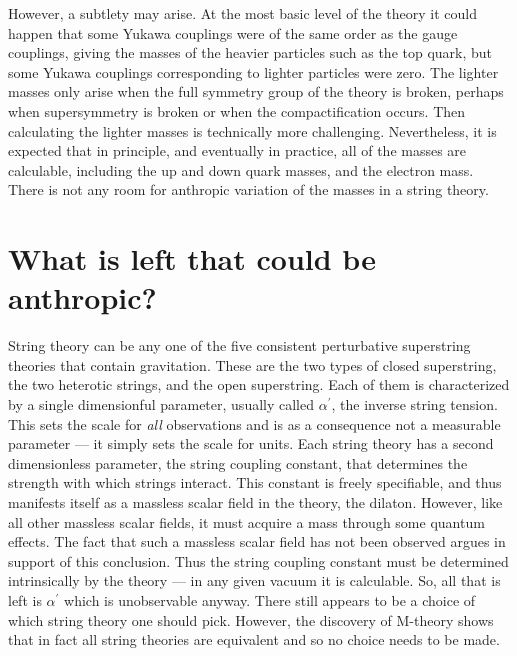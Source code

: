 \documentclass{article}
\begin{document}
However, a subtlety may arise.  At the most basic level of the
theory it could happen that some Yukawa couplings were of the same order
as the gauge couplings, giving the masses of the heavier particles such as
the top quark, but some Yukawa couplings corresponding to lighter
particles were zero.  The lighter masses only arise when the full
symmetry group of the theory is broken, perhaps when supersymmetry is
broken or when the compactification occurs.  Then calculating the lighter
masses is technically more challenging.  Nevertheless, it is expected that
in
principle, and eventually in practice, all of the masses are calculable,
including the up and down quark masses, and the electron mass.  There is
not any room for anthropic variation of the masses in a string theory.


\section{What is left that could be anthropic?}

String theory can be any one of the five consistent perturbative
superstring theories that contain gravitation. These are the two types
of closed superstring, the two heterotic strings, and the open
superstring. Each of them is characterized by a single dimensionful
parameter, usually called $\alpha^\prime$, the inverse string
tension. This sets the scale for {\it all} observations and is as a
consequence not a measurable parameter --- it simply sets the scale for
units. Each string theory has a second dimensionless parameter, the
string coupling constant, that determines the strength with which
strings interact. This constant is freely specifiable, and thus
manifests itself as a massless scalar field in the theory, the
dilaton. However, like all other massless scalar fields, it must acquire
a mass through some quantum effects. The fact that such a massless
scalar field has not been observed argues in support of this
conclusion. Thus the string coupling constant must be determined
intrinsically by the theory --- in any given vacuum it is
calculable. So, all that is left is $\alpha^\prime$ which is
unobservable anyway. There still appears to be a choice of which string
theory one should pick. However, the discovery of M-theory shows that in
fact all string theories are equivalent and so no choice needs to be
made.
\end{document}
